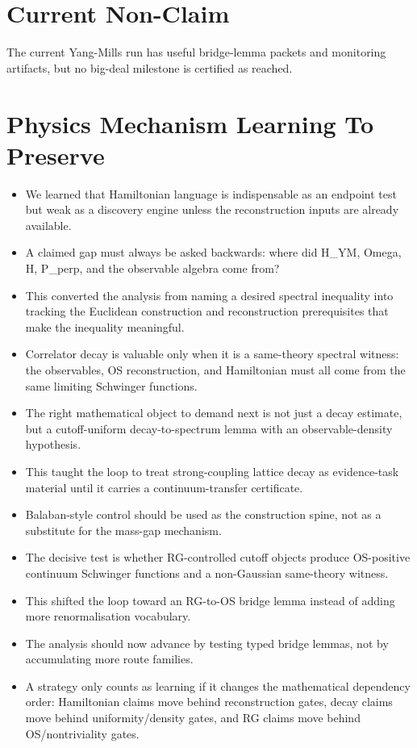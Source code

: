 \documentclass[11pt]{article}
\begin{document}
\section{Current Non-Claim}

The current Yang-Mills run has useful bridge-lemma packets and monitoring artifacts, but no big-deal milestone is certified as reached.

\section{Physics Mechanism Learning To Preserve}

\begin{itemize}
\item We learned that Hamiltonian language is indispensable as an endpoint test but weak as a discovery engine unless the reconstruction inputs are already available.
\item A claimed gap must always be asked backwards: where did H\_YM, Omega, H, P\_perp, and the observable algebra come from?
\item This converted the analysis from naming a desired spectral inequality into tracking the Euclidean construction and reconstruction prerequisites that make the inequality meaningful.
\item Correlator decay is valuable only when it is a same-theory spectral witness: the observables, OS reconstruction, and Hamiltonian must all come from the same limiting Schwinger functions.
\item The right mathematical object to demand next is not just a decay estimate, but a cutoff-uniform decay-to-spectrum lemma with an observable-density hypothesis.
\item This taught the loop to treat strong-coupling lattice decay as evidence-task material until it carries a continuum-transfer certificate.
\item Balaban-style control should be used as the construction spine, not as a substitute for the mass-gap mechanism.
\item The decisive test is whether RG-controlled cutoff objects produce OS-positive continuum Schwinger functions and a non-Gaussian same-theory witness.
\item This shifted the loop toward an RG-to-OS bridge lemma instead of adding more renormalisation vocabulary.
\item The analysis should now advance by testing typed bridge lemmas, not by accumulating more route families.
\item A strategy only counts as learning if it changes the mathematical dependency order: Hamiltonian claims move behind reconstruction gates, decay claims move behind uniformity/density gates, and RG claims move behind OS/nontriviality gates.

\end{itemize}
\end{document}

